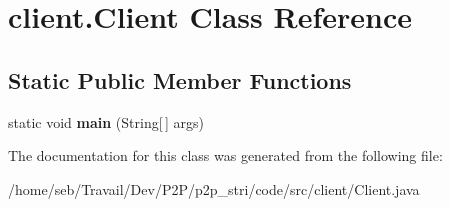 \hypertarget{classclient_1_1Client}{}\section{client.\+Client Class Reference}
\label{classclient_1_1Client}
\subsection*{Static Public Member Functions}
\begin{DoxyCompactItemize}
\item 
\mbox{\label{classclient_1_1Client_a535f4e7494d7095589ebf11a8d8f50df}} 
static void {\bfseries main} (String\mbox{[}$\,$\mbox{]} args)
\end{DoxyCompactItemize}


The documentation for this class was generated from the following file\+:\begin{DoxyCompactItemize}
\item 
/home/seb/\+Travail/\+Dev/\+P2\+P/p2p\+\_\+stri/code/src/client/Client.\+java\end{DoxyCompactItemize}
